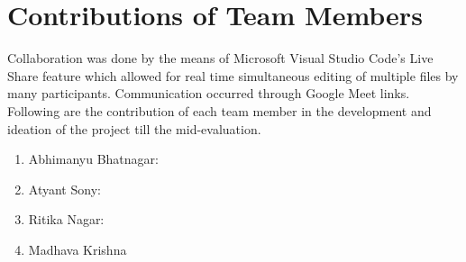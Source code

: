 \documentclass[12pt]{report}
\begin{document}
\chapter{Contributions of Team Members}
Collaboration was done by the means of Microsoft Visual Studio Code's Live Share feature which allowed for real time simultaneous editing of multiple files by many participants. Communication occurred through Google Meet links. Following are the contribution of each team member in the development and ideation of the project till the mid-evaluation.

	\begin{enumerate}
		\item Abhimanyu Bhatnagar:
		
		\item Atyant Sony:

		\item Ritika Nagar:

		\item Madhava Krishna
	\end{enumerate}
\end{document}
